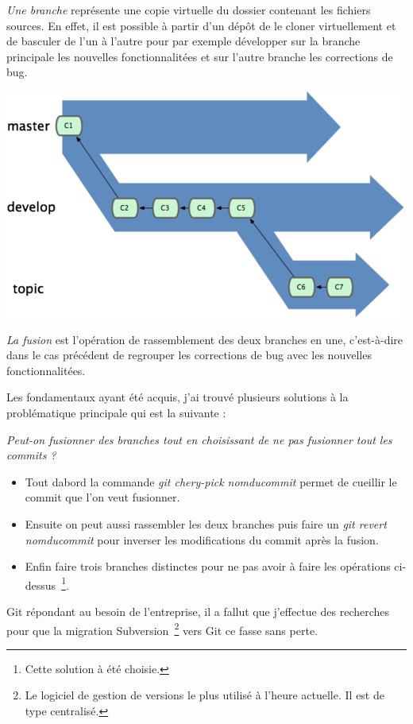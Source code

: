 \emph{Une branche} représente une \og copie virtuelle \fg{} du dossier contenant
les fichiers sources. En effet, il est possible à partir d'un dépôt de le
cloner virtuellement et de basculer de l'un à l'autre pour par exemple
développer sur la branche principale les nouvelles fonctionnalitées et sur
l'autre branche les corrections de bug.

\begin{center}
\includegraphics{images/branches.png}
\end{center}

\emph{La fusion} est l'opération de rassemblement des deux branches en une,
c'est-à-dire dans le cas précédent de regrouper les corrections de bug avec les
nouvelles fonctionnalitées.

Les fondamentaux ayant été acquis, j'ai trouvé plusieurs solutions à la
problématique principale qui est la suivante :

\textit{Peut-on fusionner des branches tout en choisissant de ne pas fusionner
tout les commits ?}

\begin{itemize}
    \item Tout dabord la commande \emph{git chery-pick \og nomducommit \fg{}}
        permet de \og cueillir \fg{} le commit que l'on veut fusionner.
    \item Ensuite on peut aussi rassembler les deux branches puis faire un
        \emph{git revert \og nomducommit \fg{}} pour inverser les modifications
        du commit après la fusion.
    \item Enfin faire trois branches distinctes pour ne pas avoir à faire les
        opérations ci-dessus\, \footnote{Cette solution à été choisie.}.
\end{itemize}

Git répondant au besoin de l'entreprise, il a fallut que j'effectue des
recherches pour que la migration Subversion\, \footnote{Le logiciel de gestion
de versions le plus utilisé à l’heure actuelle. Il est de type centralisé.}
vers Git ce fasse sans perte.

